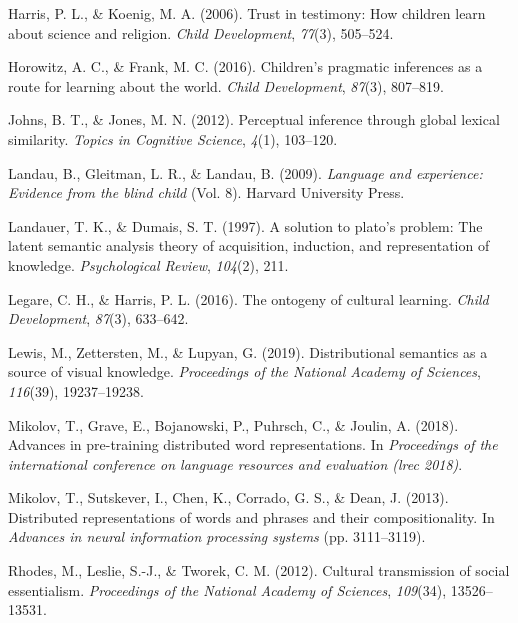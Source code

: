 \documentclass[10pt, letterpaper]{article}
\begin{document}
\leavevmode\hypertarget{ref-harris2006}{}%
Harris, P. L., \& Koenig, M. A. (2006). Trust in testimony: How children
learn about science and religion. \emph{Child Development},
\emph{77}(3), 505--524.

\leavevmode\hypertarget{ref-horowitz2016}{}%
Horowitz, A. C., \& Frank, M. C. (2016). Children's pragmatic inferences
as a route for learning about the world. \emph{Child Development},
\emph{87}(3), 807--819.

\leavevmode\hypertarget{ref-johns2012}{}%
Johns, B. T., \& Jones, M. N. (2012). Perceptual inference through
global lexical similarity. \emph{Topics in Cognitive Science},
\emph{4}(1), 103--120.

\leavevmode\hypertarget{ref-landau2009}{}%
Landau, B., Gleitman, L. R., \& Landau, B. (2009). \emph{Language and
experience: Evidence from the blind child} (Vol. 8). Harvard University
Press.

\leavevmode\hypertarget{ref-landauer1997}{}%
Landauer, T. K., \& Dumais, S. T. (1997). A solution to plato's problem:
The latent semantic analysis theory of acquisition, induction, and
representation of knowledge. \emph{Psychological Review}, \emph{104}(2),
211.

\leavevmode\hypertarget{ref-legare2016}{}%
Legare, C. H., \& Harris, P. L. (2016). The ontogeny of cultural
learning. \emph{Child Development}, \emph{87}(3), 633--642.

\leavevmode\hypertarget{ref-lewis2019}{}%
Lewis, M., Zettersten, M., \& Lupyan, G. (2019). Distributional
semantics as a source of visual knowledge. \emph{Proceedings of the
National Academy of Sciences}, \emph{116}(39), 19237--19238.

\leavevmode\hypertarget{ref-mikolov2018}{}%
Mikolov, T., Grave, E., Bojanowski, P., Puhrsch, C., \& Joulin, A.
(2018). Advances in pre-training distributed word representations. In
\emph{Proceedings of the international conference on language resources
and evaluation (lrec 2018)}.

\leavevmode\hypertarget{ref-mikolov2013}{}%
Mikolov, T., Sutskever, I., Chen, K., Corrado, G. S., \& Dean, J.
(2013). Distributed representations of words and phrases and their
compositionality. In \emph{Advances in neural information processing
systems} (pp. 3111--3119).

\leavevmode\hypertarget{ref-rhodes2012}{}%
Rhodes, M., Leslie, S.-J., \& Tworek, C. M. (2012). Cultural
transmission of social essentialism. \emph{Proceedings of the National
Academy of Sciences}, \emph{109}(34), 13526--13531.
\end{document}

